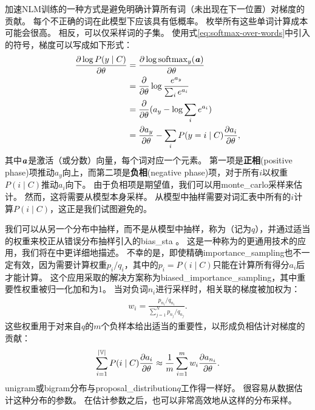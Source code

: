 \subsubsection{}
\label{sec:importance_sampling_chap12}
加速\gls{NLM}训练的一种方式是避免明确计算所有词（未出现在下一位置）对梯度的贡献。
每个不正确的词在此模型下应该具有低概率。
枚举所有这些单词计算成本可能会很高。
相反，可以仅采样词的子集。
使用式\eqref{eq:softmax-over-words}中引入的符号，梯度可以写成如下形式：
\begin{align}
 \frac{\partial \log P(y \mid C)}{\partial \theta} &= \frac{\partial \log {\rm softmax}_y(\boldsymbol{\mathit{a}})}{\partial \theta} \\ 
  &= \frac{\partial}{\partial \theta} \log \frac{e^{a_y}}{\sum_i e^{a_i}} \\ 
 &= \frac{\partial}{\partial \theta} (a_y - \log \sum_i e^{a_i}) \\ 
 &= \frac{\partial a_y}{\partial \theta}  - \sum_i P(y = i \mid C) \frac{\partial a_i}{\partial \theta},
\end{align}
其中$\boldsymbol{\mathit{a}}$是激活（或分数）向量，每个词对应一个元素。
第一项是\textbf{正相}(positive phase)项推动$a_y$向上，而第二项是\textbf{负相}(negative phase)项，对于所有$i$以权重$P(i \mid C)$推动$a_i$向下。
由于负相项是期望值，我们可以用\gls{monte_carlo}采样来估计。
然而，这将需要从模型本身采样。
从模型中抽样需要对词汇表中所有的$i$计算$P(i \mid C)$，这正是我们试图避免的。

我们可以从另一个分布中抽样，而不是从模型中抽样，称为（记为$q$），并通过适当的权重来校正从错误分布抽样引入的\gls{bias_sta} \citep{Bengio+Senecal-2003-small,Bengio+Senecal-2008}。
这是一种称为的更通用技术的应用，我们将在中更详细地描述。
不幸的是，即使精确\gls{importance_sampling}也不一定有效，因为需要计算权重$p_i / q_i$，其中的$p_i = P(i \mid C)$只能在计算所有得分$a_i$后才能计算。
这个应用采取的解决方案称为\gls{biased_importance_sampling}，其中重要性权重被归一化加和为1。
当对负词$n_i$进行采样时，相关联的梯度被加权为：
\begin{align}
  w_i = \frac{p_{n_i} / q_{n_i}}{\sum_{j=1}^N p_{n_j} / q_{n_j}}.
\end{align}
这些权重用于对来自$q$的$m$个负样本给出适当的重要性，以形成负相估计对梯度的贡献：
\begin{align}
  \sum_{i=1}^{|\mathbb{V}|} P(i \mid C) \frac{\partial a_i}{\partial \theta}  \approx \frac{1}{m} \sum_{i=1}^m w_i \frac{\partial a_{n_i}}{\partial \theta}.
  \end{align}
  \gls{unigram}或\gls{bigram}分布与\gls{proposal_distribution}$q$工作得一样好。
很容易从数据估计这种分布的参数。
在估计参数之后，也可以非常高效地从这样的分布采样。

